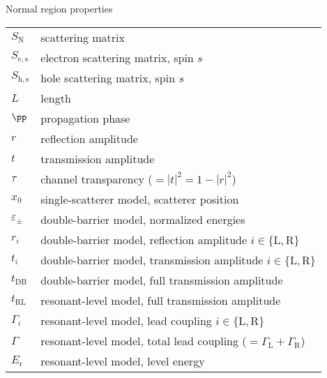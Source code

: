 {\Large\noindent Normal region properties}
\vspace{-.2cm}
\begin{longtable}{ m{5em} m{29em}}
$S_\mathrm{N}$ & scattering matrix \\
$S_\mathrm{e,s}$ & electron scattering matrix, spin $s$ \\
$S_\mathrm{h,s}$ & hole scattering matrix, spin $s$ \\
$L$ & length \\
$\pp$ & propagation phase \\
$r$ & reflection amplitude \\
$t$ & transmission amplitude \\
$\tau$ & channel transparency ($= |t|^2 = 1 - |r|^2$) \\
$x_0$ & single-scatterer model, scatterer position \\
$\varepsilon_\pm$ & double-barrier model, normalized energies \\
$r_i$ & double-barrier model, reflection amplitude $i \in \{\mathrm{L}, \mathrm{R} \}$ \\
$t_i$ & double-barrier model, transmission amplitude $i \in \{\mathrm{L}, \mathrm{R} \}$ \\
$t_\mathrm{DB}$ & double-barrier model, full transmission amplitude \\
$t_\mathrm{RL}$ & resonant-level model, full transmission amplitude \\
$\Gamma_i$ & resonant-level model, lead coupling $i \in \{\mathrm{L}, \mathrm{R} \}$ \\
$\Gamma$ & resonant-level model, total lead coupling ($=\Gamma_\mathrm{L} + \Gamma_\mathrm{R}$) \\
$E_\mathrm{r}$ & resonant-level model, level energy \\
\end{longtable}
\vspace{.2cm}


